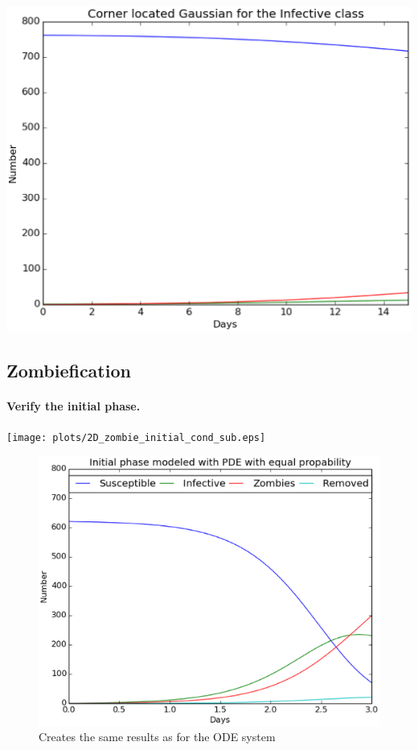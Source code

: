 \documentclass[%
twoside,                 %
final,                   %
10pt]{article}
\begin{document}
\centerline{\includegraphics[width=0.8\linewidth]{plots/2D_british_school_gauss_corner_long_number.eps}}



\subsection{Zombiefication}
\paragraph{Verify the initial phase.}
\centerline{\texttt{[image: plots/2D\_zombie\_initial\_cond\_sub.eps]}}




\begin{figure}[ht]
  \centerline{\includegraphics[width=0.8\linewidth]{plots/2D_zombie_initial_cond_number.eps}}
  \caption{
  Creates the same results as for the ODE system
  }
\end{figure}
\end{document}
